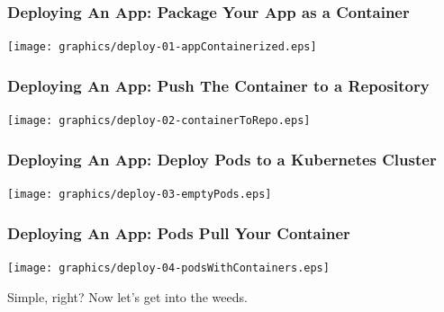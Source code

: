    \begin{frame}
        \frametitle{Deploying An App: Package Your App as a Container}
        \texttt{[image: graphics/deploy-01-appContainerized.eps]}
    \end{frame}

    \begin{frame}
        \frametitle{Deploying An App: Push The Container to a Repository}
        \texttt{[image: graphics/deploy-02-containerToRepo.eps]}
    \end{frame}

    \begin{frame}
        \frametitle{Deploying An App: Deploy Pods to a Kubernetes Cluster}
        \texttt{[image: graphics/deploy-03-emptyPods.eps]}
    \end{frame}

    \begin{frame}
        \frametitle{Deploying An App: Pods Pull Your Container}
        \texttt{[image: graphics/deploy-04-podsWithContainers.eps]}
    \end{frame}

    \begin{frame}
        \begin{center}
            \Huge Simple, right? Now let's get into the weeds.
        \end{center}
    \end{frame}

